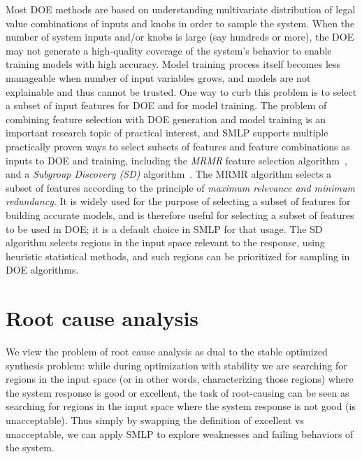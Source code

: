 \documentclass[a4paper,parskip=half]{article} %
\begin{document}
Most DOE methods are based on understanding multivariate distribution of legal value combinations
of inputs and knobs in order to sample the system.
When the number of system inputs and/or knobs is large (say hundreds or more), the DOE may not  generate  
a high-quality coverage of the system’s behavior to enable training models with high accuracy.
Model training process itself becomes less manageable when number of input variables grows,
and models are not explainable and thus cannot be trusted.
One way to curb this problem is to select a subset of input features for DOE and for model training.
The problem of combining feature selection with DOE generation and model training
is an important research topic of practical interest, and SMLP supports multiple practically proven ways
to select subsets of features and feature combinations as inputs to DOE and training, including the \emph{MRMR}
feature selection algorithm~\cite{DBLP:journals/jbcb/DingP05}, and a \emph{Subgroup Discovery (SD)}
algorithm~\cite{DBLP:books/mit/fayyadPSU96/Klosgen96,DBLP:conf/pkdd/Wrobel97,DBLP:journals/widm/Atzmueller15}.
The MRMR algorithm selects a subset of features according to the principle of \emph{maximum relevance and 
minimum redundancy}. It is widely used for the purpose of selecting a subset of features for building accurate models,
and is therefore useful for selecting a subset of features to be used in DOE; it is a default choice in SMLP for that usage.
The SD algorithm selects regions in the input space relevant to the response, using heuristic statistical methods,
and such regions can be prioritized for sampling in DOE algorithms.



\section{Root cause analysis}\label{sec:rca}

We view the problem of root cause analysis as dual to the stable optimized synthesis problem: while during optimization with 
stability we are searching for regions in the input space (or in other words, characterizing those regions) where the system response 
is good or excellent, the task of root-causing can be seen as searching for regions in the input space where the system response is 
not good (is unacceptable). Thus simply by swapping the definition of excellent vs unacceptable, we can apply SMLP to explore 
weaknesses and failing behaviors of the system.
\end{document}

